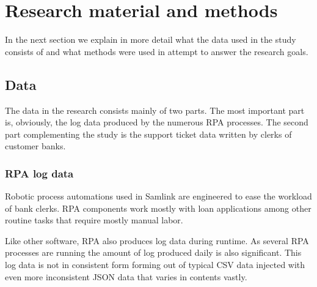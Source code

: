 \documentclass[english, 12pt, a4paper, elec, utf8, a-1b, online]{aaltothesis}
\begin{document}




\clearpage




\section{Research material and methods}\label{sec:research-material-and-methods}

In the next section
we explain in more detail
what the data used in the study
consists of
and what methods were used
in attempt to answer the research goals.

\subsection{Data}\label{subsec:data}
The data in the research consists mainly of two parts.
The most important part is, obviously,
the log data produced by the numerous RPA processes.
The second part complementing the study
is the support ticket data written by clerks of customer banks.

\subsubsection*{RPA log data}
Robotic process automations used in Samlink
are engineered %
to ease the workload of
bank clerks.
RPA components %
work mostly with loan applications %
among other routine tasks
that require mostly manual labor.

Like other software,
RPA also produces log data during runtime.
As several RPA processes are running %
the amount of log produced daily is also significant. %
This log data is not in consistent form
forming out of typical CSV data
injected with even more inconsistent JSON data
that varies in contents vastly.
\end{document}

